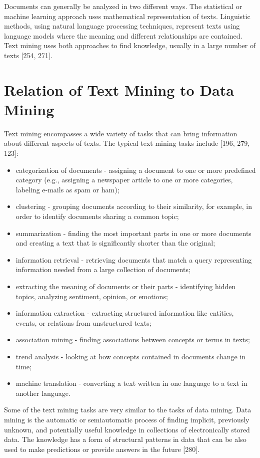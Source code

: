 \documentclass[11pt,openany,executivepaper]{book}
\begin{document}
Documents can generally be analyzed in two different ways. The statistical or machine learning approach uses mathematical representation of texts. Linguistic methods, using natural language processing techniques, represent texts using language models where the meaning and different relationships are contained. Text mining uses both approaches to find knowledge, usually in a large number of texts [254, 271].
\section{Relation of Text Mining to Data Mining}
Text mining encompasses a wide variety of tasks that can bring information about different aspects of texts. The typical text mining tasks include [196, 279, 123]:
\begin{itemize}
  \item categorization of documents - assigning a document to one or more predefined category (e.g., assigning a newspaper article to one or more categories, labeling e-mails as spam or ham);
  \item clustering - grouping documents according to their similarity, for example, in order to identify documents sharing a common topic;
  \item summarization - finding the most important parts in one or more documents and creating a text that is significantly shorter than the original;
  \item information retrieval - retrieving documents that match a query representing information needed from a large collection of documents;
  \item extracting the meaning of documents or their parts - identifying hidden topics, analyzing sentiment, opinion, or emotions;
  \item information extraction - extracting structured information like entities, events, or relations from unstructured texts;
  \item association mining - finding associations between concepts or terms in texts;
  \item trend analysis - looking at how concepts contained in documents change in time;
  \item machine translation - converting a text written in one language to a text in another language.
\end{itemize}
Some of the text mining tasks are very similar to the tasks of data mining. Data mining is the automatic or semiautomatic process of finding implicit, previously unknown, and potentially useful knowledge in collections of electronically stored data. The knowledge has a form of structural patterns in data that can be also used to make predictions or provide answers in the future [280].
\end{document}
